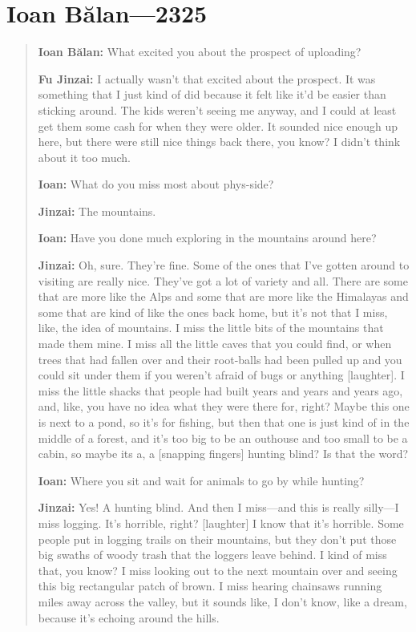 \hypertarget{ioan-bux103lan-2325}{%
\chapter{Ioan Bălan—2325}\label{ioan-bux103lan-2325}}

\begin{quote}
\textbf{Ioan Bălan:} What excited you about the prospect of uploading?

\textbf{Fu Jinzai:} I actually wasn't that excited about the prospect. It was something that I just kind of did because it felt like it'd be easier than sticking around. The kids weren't seeing me anyway, and I could at least get them some cash for when they were older. It sounded nice enough up here, but there were still nice things back there, you know? I didn't think about it too much.

\textbf{Ioan:} What do you miss most about phys-side?

\textbf{Jinzai:} The mountains.

\textbf{Ioan:} Have you done much exploring in the mountains around here?

\textbf{Jinzai:} Oh, sure. They're fine. Some of the ones that I've gotten around to visiting are really nice. They've got a lot of variety and all. There are some that are more like the Alps and some that are more like the Himalayas and some that are kind of like the ones back home, but it's not that I miss, like, the idea of mountains. I miss the little bits of the mountains that made them mine. I miss all the little caves that you could find, or when trees that had fallen over and their root-balls had been pulled up and you could sit under them if you weren't afraid of bugs or anything {[}laughter{]}. I miss the little shacks that people had built years and years and years ago, and, like, you have no idea what they were there for, right? Maybe this one is next to a pond, so it's for fishing, but then that one is just kind of in the middle of a forest, and it's too big to be an outhouse and too small to be a cabin, so maybe its a, a {[}snapping fingers{]} hunting blind? Is that the word?

\textbf{Ioan:} Where you sit and wait for animals to go by while hunting?

\textbf{Jinzai:} Yes! A hunting blind. And then I miss---and this is really silly---I miss logging. It's horrible, right? {[}laughter{]} I know that it's horrible. Some people put in logging trails on their mountains, but they don't put those big swaths of woody trash that the loggers leave behind. I kind of miss that, you know? I miss looking out to the next mountain over and seeing this big rectangular patch of brown. I miss hearing chainsaws running miles away across the valley, but it sounds like, I don't know, like a dream, because it's echoing around the hills.


\end{quote}
